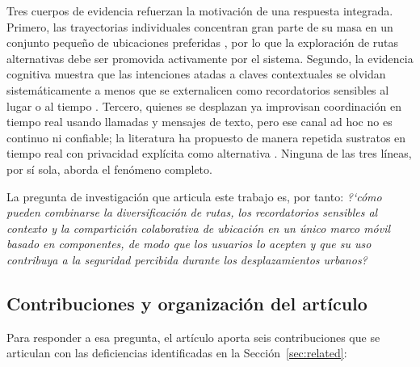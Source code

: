 \documentclass[a4paper,fleqn]{cas-sc}
\begin{document}
	Tres cuerpos de evidencia refuerzan la motivaci\'on de una respuesta integrada. Primero, las trayectorias individuales concentran gran parte de su masa en un conjunto peque\~no de ubicaciones preferidas \citep{cagney2025urban,liu2022route,song2010predictability}, por lo que la exploraci\'on de rutas alternativas debe ser promovida activamente por el sistema. Segundo, la evidencia cognitiva muestra que las intenciones atadas a claves contextuales se olvidan sistem\'aticamente a menos que se externalicen como recordatorios sensibles al lugar o al tiempo \citep{rummel2023prospective,ball2025offloading}. Tercero, quienes se desplazan ya improvisan coordinaci\'on en tiempo real usando llamadas y mensajes de texto, pero ese canal ad hoc no es continuo ni confiable; la literatura ha propuesto de manera repetida sustratos en tiempo real con privacidad expl\'icita como alternativa \citep{li2017locsharing,mckenzie2022privyto,shokri2014mobicrowd}. Ninguna de las tres l\'ineas, por s\'i sola, aborda el fen\'omeno completo.
	
	La pregunta de investigaci\'on que articula este trabajo es, por tanto: \emph{?`c\'omo pueden combinarse la diversificaci\'on de rutas, los recordatorios sensibles al contexto y la compartici\'on colaborativa de ubicaci\'on en un \'unico marco m\'ovil basado en componentes, de modo que los usuarios lo acepten y que su uso contribuya a la seguridad percibida durante los desplazamientos urbanos?}
	
	\subsection{Contribuciones y organizaci\'on del art\'iculo}\label{sec:contrib}
	
	Para responder a esa pregunta, el art\'iculo aporta seis contribuciones que se articulan con las deficiencias identificadas en la Secci\'on~\ref{sec:related}:
	
\end{document}
